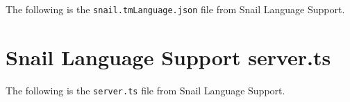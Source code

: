 \documentclass{article}
\begin{document}
\begin{appendices}
    The following is the \lstinline{snail.tmLanguage.json} file from Snail Language Support.
    
    \label{app:snail-tmLanguage}

\newpage
\section{Snail Language Support server.ts}

    The following is the \lstinline{server.ts} file from Snail Language Support.
    
    \label{app:server-ts}

\end{appendices}
\end{document}
